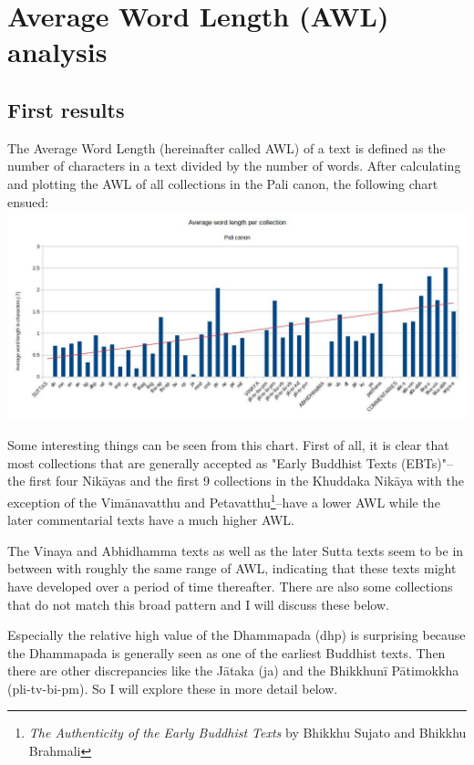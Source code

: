 \section{Average Word Length (AWL) analysis}
\subsection{First results}
The Average Word Length (hereinafter called AWL) of a text is defined as the number of characters in a text divided by the number of words.
After calculating and plotting the AWL of all collections in the Pali canon, the following chart ensued:\\

\includegraphics[width=\linewidth]{chart1.jpg}
\label{chart1}

\medskip
Some interesting things can be seen from this chart. First of all, it is clear that most collections that are generally accepted as "Early Buddhist Texts (EBTs)"--the first four Nikāyas and the first 9 collections in the Khuddaka Nikāya with the exception of the Vimānavatthu and Petavatthu\footnote{{\em The Authenticity of the Early Buddhist Texts} by Bhikkhu Sujato and Bhikkhu Brahmali}--have a lower AWL while the later commentarial texts have a much higher AWL.

The Vinaya and Abhidhamma texts as well as the later Sutta texts seem to be in between with roughly the same range of AWL, indicating that these texts might have developed over a period of time thereafter. There are also some collections that do not match this broad pattern and I will discuss these below.

Especially the relative high value of the Dhammapada (dhp) is surprising because the Dhammapada is generally seen as one of the earliest Buddhist texts. Then there are other discrepancies like the Jātaka (ja) and the Bhikkhunī Pātimokkha (pli-tv-bi-pm). So I will explore these in more detail below.

